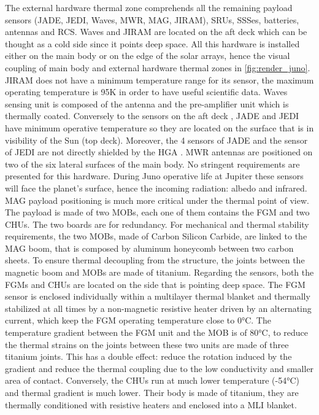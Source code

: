     The external hardware thermal zone comprehends all the remaining payload sensors (JADE, JEDI, Waves, MWR, MAG, JIRAM), SRUs, SSSes, batteries, antennas and RCS. Waves and JIRAM are located on the aft deck which can be thought as a cold side since it points deep space. All this hardware is installed either on the main body or on the edge of the solar arrays, hence the visual coupling of main body and external hardware thermal zones in \autoref{fig:render_juno}. JIRAM does not have a minimum temperature range for its sensor, the maximum operating temperature is 95K in order to have useful scientific data.\cite{JIRAM_info} Waves sensing unit is composed of the antenna and the pre-amplifier unit which is thermally coated. Conversely to the sensors on the aft deck \cite{Waves_info}, JADE and JEDI have minimum operative temperature so they are located on the surface that is in visibility of the Sun (top deck). Moreover, the 4 sensors of JADE and the sensor of JEDI are not directly shielded by the HGA \cite{JADE_info}.\cite{JEDI_info} MWR antennas are positioned on two of the six lateral surfaces of the main body. \cite{MWR_info} No stringent requirements are presented for this hardware. During Juno operative life at Jupiter these sensors will face the planet's surface, hence the incoming radiation: albedo and infrared. 
    MAG payload positioning is much more critical under the thermal point of view. The payload is made of two MOBs, each one of them contains the FGM and two CHUs. The two boards are for redundancy. 
    For mechanical and thermal stability requirements, the two MOBs, made of Carbon Silicon Carbide, are linked to the MAG boom, that is composed by aluminum honeycomb between two carbon sheets. To ensure thermal decoupling from the structure, the joints between the magnetic boom and MOBs are made of titanium. 
    Regarding the sensors, both the FGMs and CHUs are located on the side that is pointing deep space.
    The FGM sensor is enclosed individually within a multilayer thermal blanket and thermally stabilized at all times by a non-magnetic resistive heater driven by an alternating current, which keep the FGM operating temperature close to 0°C. The temperature gradient between the FGM unit and the MOB is of 80°C, to reduce the thermal strains on the joints between these two units are made of three titanium joints.  This has a double effect: reduce the rotation induced by the gradient and reduce the thermal coupling due to the low conductivity and smaller area of contact.
    Conversely, the CHUs run at much lower temperature (-54°C) and thermal gradient is much lower. Their body is made of titanium, they are thermally conditioned with resistive heaters and enclosed into a MLI blanket.  

